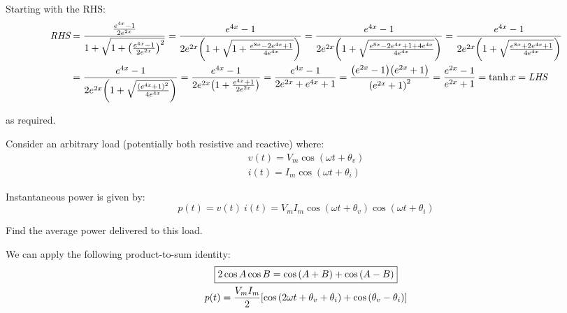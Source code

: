 \documentclass{article}
\begin{document}
Starting with the RHS:
\begin{align*}
    \rhs
    &= \frac{\frac{e^{4x} - 1}{2 e^{2x}}}{1 + \sqrt{1 + \parens*{\frac{e^{4x} - 1}{2 e^{2x}}}^2}}
    = \frac{e^{4x} - 1}{2 e^{2x} \parens*{1 + \sqrt{1 + \frac{e^{8x} - 2 e^{4x} + 1}{4 e^{4x}}}}}
    = \frac{e^{4x} - 1}{2 e^{2x} \parens*{1 + \sqrt{\frac{e^{8x} - 2 e^{4x} + 1 + 4 e^{4x}}{4 e^{4x}}}}}
    = \frac{e^{4x} - 1}{2 e^{2x} \parens*{1 + \sqrt{\frac{e^{8x} + 2 e^{4x} + 1}{4 e^{4x}}}}}
    \\
    &= \frac{e^{4x} - 1}{2 e^{2x} \parens*{1 + \sqrt{\frac{\parens*{e^{4x} + 1}^2}{4 e^{4x}}}}}
    = \frac{e^{4x} - 1}{2 e^{2x} \parens*{1 + \frac{e^{4x} + 1}{2 e^{2x}}}}
    = \frac{e^{4x} - 1}{2 e^{2x} + e^{4x} + 1}
    = \frac{\parens*{e^{2x} - 1} \parens*{e^{2x} + 1}}{\parens*{e^{2x} + 1}^2}
    = \frac{e^{2x} - 1}{e^{2x} + 1}
    = \tanh{x}
    = \lhs
\end{align*}

as required.


\bigskip

\begin{QuestionFrame}
    Consider an arbitrary load (potentially both resistive and reactive) where:
    \begin{gather*}
        v(t) = V_m \cos{(\omega t + \theta_v)} \\
        i(t) = I_m \cos{(\omega t + \theta_i)}
    \end{gather*}
    
    Instantaneous power is given by:
    \begin{equation*}
        p(t) = v(t)\ i(t) = V_m I_m \cos{(\omega t + \theta_v)} \cos{(\omega t + \theta_i)}
    \end{equation*}

    Find the average power delivered to this load.
\end{QuestionFrame}

We can apply the following product-to-sum identity:
\begin{gather*}
    \boxed{
        2 \cos{A} \cos{B} = \cos{(A+B)} + \cos{(A-B)}
    } \\
    p(t) = \frac{V_m I_m}{2} \brackets*{\cos{(2 \omega t + \theta_v + \theta_i)} + \cos{(\theta_v - \theta_i)}}
\end{gather*}
\end{document}
